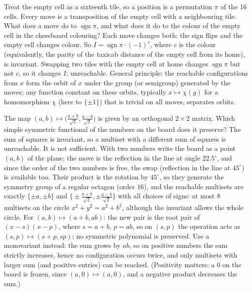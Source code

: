 \documentclass[11pt,a4paper]{article}
\begin{document}

 Treat the empty cell as a sixteenth tile, so a position is a permutation $\pi$ of the 16 cells. Every move is a transposition of the empty cell with a neighbouring tile. What does a move do to $\operatorname{sgn}\pi$, and what does it do to the colour of the empty cell in the chessboard colouring?
 Each move changes both: the sign flips and the empty cell changes colour. So $I=\operatorname{sgn}\pi\cdot(-1)^{c}$, where $c$ is the colour (equivalently, the parity of the taxicab distance of the empty cell from its home), is invariant.
 Swapping two tiles with the empty cell at home changes $\operatorname{sgn}\pi$ but not $c$, so it changes $I$: unreachable. General principle: the reachable configurations from $x$ form the orbit of $x$ under the group (or semigroup) generated by the moves; any function constant on these orbits, typically $x\mapsto\chi(g)$ for a homomorphism $\chi$ (here to $\{\pm1\}$) that is trivial on all moves, separates orbits.

 The map $(a,b)\mapsto\bigl(\frac{a+b}{\sqrt2},\frac{a-b}{\sqrt2}\bigr)$ is given by an orthogonal $2\times2$ matrix. Which simple symmetric functional of the numbers on the board does it preserve?
 The sum of squares is invariant, so a multiset with a different sum of squares is unreachable. It is not sufficient. With two numbers write the board as a point $(a,b)$ of the plane; the move is the reflection in the line at angle $22.5^\circ$, and since the order of the two numbers is free, the swap (reflection in the line at $45^\circ$) is available too. Their product is the rotation by $45^\circ$, so they generate the symmetry group of a regular octagon (order $16$), and the reachable multisets are exactly $\{\pm a,\pm b\}$ and $\bigl\{\pm\frac{a+b}{\sqrt2},\pm\frac{a-b}{\sqrt2}\bigr\}$ with all choices of signs: at most $8$ multisets on the circle $x^2+y^2=a^2+b^2$, although the invariant allows the whole circle.
 For $(a,b)\mapsto(a+b,ab)$: the new pair is the root pair of $(x-s)(x-p)$, where $s=a+b$, $p=ab$, so on $(s,p)$ the operation acts as $(s,p)\mapsto(s+p,sp)$; no symmetric polynomial is preserved. Use a monovariant instead: the sum grows by $ab$, so on positive numbers the sum strictly increases, hence no configuration occurs twice, and only multisets with larger sum (and positive entries) can be reached. (Positivity matters: a $0$ on the board is frozen, since $(a,0)\mapsto(a,0)$, and a negative product decreases the sum.)
\end{document}
